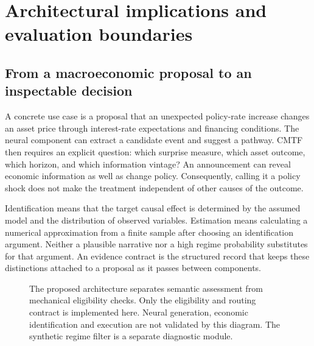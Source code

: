 \section{Architectural implications and evaluation boundaries}
\subsection{From a macroeconomic proposal to an inspectable decision}
A concrete use case is a proposal that an unexpected policy-rate increase changes an asset price through interest-rate expectations and financing conditions. The neural component can extract a candidate event and suggest a pathway. CMTF then requires an explicit question: which surprise measure, which asset outcome, which horizon, and which information vintage? An announcement can reveal economic information as well as change policy. Consequently, calling it a policy shock does not make the treatment independent of other causes of the outcome.

Identification means that the target causal effect is determined by the assumed model and the distribution of observed variables. Estimation means calculating a numerical approximation from a finite sample after choosing an identification argument. Neither a plausible narrative nor a high regime probability substitutes for that argument. An evidence contract is the structured record that keeps these distinctions attached to a proposal as it passes between components.

\begin{figure}[htbp]
\centering
{}
\caption{The proposed architecture separates semantic assessment from mechanical eligibility checks. Only the eligibility and routing contract is implemented here. Neural generation, economic identification and execution are not validated by this diagram. The synthetic regime filter is a separate diagnostic module.}
\end{figure}

